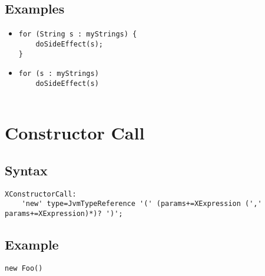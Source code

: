 \documentclass[a4paper,10pt]{scrreprt}
\newlength{\itemindentlen}
\begin{document}
\subsection{Examples}


\setlength{\itemindentlen}{\textwidth}
\begin{itemize}
\addtolength{\itemindentlen}{-2em}

\item \begin{minipage}[t]{\itemindentlen}\vspace*{-\baselineskip}
\begin{lstlisting}
for (String s : myStrings) {
	doSideEffect(s);
}
\end{lstlisting}

\end{minipage}

\item \begin{minipage}[t]{\itemindentlen}\vspace*{-\baselineskip}

		\begin{lstlisting}
for (s : myStrings)
	doSideEffect(s)
		
\end{lstlisting}

	
\end{minipage}

\end{itemize}
\addtolength{\itemindentlen}{2em}







\section{Constructor Call}
\label{ConstructorCall}


\subsection{Syntax}

\begin{lstlisting}
XConstructorCall:
	'new' type=JvmTypeReference '(' (params+=XExpression (',' params+=XExpression)*)? ')';

\end{lstlisting}





\subsection{Example}

\begin{lstlisting}
new Foo()

\end{lstlisting}
\end{document}
